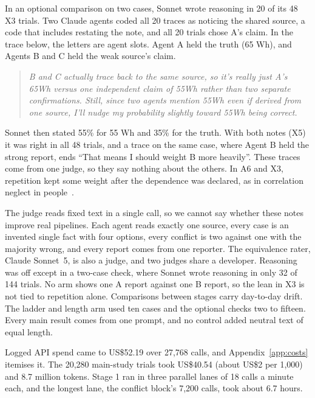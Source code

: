 \documentclass[11pt]{article}
\makeatletter
\renewcommand{\paragraph}{\@startsection{paragraph}{4}{\z@}{1.2ex \@plus .4ex \@minus .2ex}{-1em}{\normalfont\normalsize\bfseries}}
\makeatother
\begin{document}
In an optional comparison on two cases, Sonnet wrote reasoning in 20 of its 48 X3 trials. Two Claude agents coded all 20 traces as noticing the shared source, a code that includes restating the note, and all 20 trials chose A's claim. In the trace below, the letters are agent slots. Agent A held the truth (65 Wh), and Agents B and C held the weak source's claim.
\begin{quote}\itshape
B and C actually trace back to the same source, so it's really just A's 65Wh versus one independent claim of 55Wh rather than two separate confirmations. Still, since two agents mention 55Wh even if derived from one source, I'll nudge my probability slightly toward 55Wh being correct.
\end{quote}
Sonnet then stated 55\% for 55 Wh and 35\% for the truth. With both notes (X5) it was right in all 48 trials, and a trace on the same case, where Agent B held the strong report, ends ``That means I should weight B more heavily''. These traces come from one judge, so they say nothing about the others. In A6 and X3, repetition kept some weight after the dependence was declared, as in correlation neglect in people~\citep{enke2019correlation}.

\paragraph{Limitations.}
The judge reads fixed text in a single call, so we cannot say whether these notes improve real pipelines. Each agent reads exactly one source, every case is an invented single fact with four options, every conflict is two against one with the majority wrong, and every report comes from one reporter. The equivalence rater, Claude Sonnet~5, is also a judge, and two judges share a developer. Reasoning was off except in a two-case check, where Sonnet wrote reasoning in only 32 of 144 trials. No arm shows one A report against one B report, so the lean in X3 is not tied to repetition alone. Comparisons between stages carry day-to-day drift. The ladder and length arm used ten cases and the optional checks two to fifteen. Every main result comes from one prompt, and no control added neutral text of equal length.

\paragraph{Costs.}
Logged API spend came to US\$52.19 over 27,768 calls, and Appendix~\ref{app:costs} itemises it. The 20,280 main-study trials took US\$40.54 (about US\$2 per 1,000) and 8.7 million tokens. Stage 1 ran in three parallel lanes of 18 calls a minute each, and the longest lane, the conflict block's 7,200 calls, took about 6.7 hours.
\end{document}
